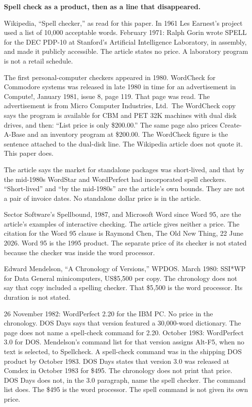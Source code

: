 \documentclass[
  10pt,
]{article}
\begin{document}
\textbf{Spell check as a product, then as a line that disappeared.}

Wikipedia, ``Spell checker,'' as read for this paper. In 1961 Les
Earnest's project used a list of 10,000 acceptable words. February 1971:
Ralph Gorin wrote SPELL for the DEC PDP-10 at Stanford's Artificial
Intelligence Laboratory, in assembly, and made it publicly accessible.
The article states no price. A laboratory program is not a retail
schedule.

The first personal-computer checkers appeared in 1980. WordCheck for
Commodore systems was released in late 1980 in time for an advertisement
in Compute!, January 1981, issue 8, page 119. That page was read. The
advertisement is from Micro Computer Industries, Ltd.~The WordCheck copy
says the program is available for CBM and PET 32K machines with dual
disk drives, and then: ``List price is only \$200.00.'' The same page
also prices Create-A-Base and an inventory program at \$200.00. The
WordCheck figure is the sentence attached to the dual-disk line. The
Wikipedia article does not quote it. This paper does.

The article says the market for standalone packages was short-lived, and
that by the mid-1980s WordStar and WordPerfect had incorporated spell
checkers. ``Short-lived'' and ``by the mid-1980s'' are the article's own
bounds. They are not a pair of invoice dates. No standalone dollar price
is in the article.

Sector Software's Spellbound, 1987, and Microsoft Word since Word 95,
are the article's examples of interactive checking. The article gives
neither a price. The citation for the Word 95 clause is Raymond Chen,
The Old New Thing, 22 June 2026. Word 95 is the 1995 product. The
separate price of its checker is not stated because the checker was
inside the word processor.

Edward Mendelson, ``A Chronology of Versions,'' WPDOS. March 1980:
SSI*WP for Data General minicomputers, US\$5,500 per copy. The
chronology does not say that copy included a spelling checker. That
\$5,500 is the word processor. Its duration is not stated.

26 November 1982: WordPerfect 2.20 for the IBM PC. No price in the
chronology. DOS Days says that version featured a 30,000-word
dictionary. The page does not name a spell-check command for 2.20.
October 1983: WordPerfect 3.0 for DOS. Mendelson's command list for that
version assigns Alt-F5, when no text is selected, to Spellcheck. A
spell-check command was in the shipping DOS product by October 1983. DOS
Days states that version 3.0 was released at Comdex in October 1983 for
\$495. The chronology does not print that price. DOS Days does not, in
the 3.0 paragraph, name the spell checker. The command list does. The
\$495 is the word processor. The spell command is not given its own
price.
\end{document}
